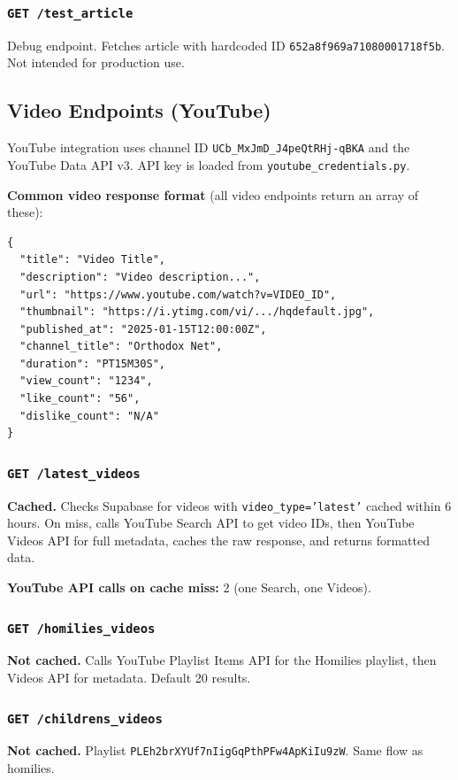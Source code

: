 \documentclass[12pt]{article}
\begin{document}
\subsubsection{\texttt{GET /test\_article}}
Debug endpoint. Fetches article with hardcoded ID \texttt{652a8f969a71080001718f5b}. Not intended for production use.

\subsection{Video Endpoints (YouTube)}

YouTube integration uses channel ID \texttt{UCb\_MxJmD\_J4peQtRHj-qBKA} and the YouTube Data API v3. API key is loaded from \texttt{youtube\_credentials.py}.

\textbf{Common video response format} (all video endpoints return an array of these):
\begin{lstlisting}[language={}, basicstyle=\ttfamily\footnotesize, frame=none, numbers=none]
{
  "title": "Video Title",
  "description": "Video description...",
  "url": "https://www.youtube.com/watch?v=VIDEO_ID",
  "thumbnail": "https://i.ytimg.com/vi/.../hqdefault.jpg",
  "published_at": "2025-01-15T12:00:00Z",
  "channel_title": "Orthodox Net",
  "duration": "PT15M30S",
  "view_count": "1234",
  "like_count": "56",
  "dislike_count": "N/A"
}
\end{lstlisting}

\subsubsection{\texttt{GET /latest\_videos}}
\textbf{Cached.} Checks Supabase for videos with \texttt{video\_type='latest'} cached within 6 hours. On miss, calls YouTube Search API to get video IDs, then YouTube Videos API for full metadata, caches the raw response, and returns formatted data.

\textbf{YouTube API calls on cache miss:} 2 (one Search, one Videos).

\subsubsection{\texttt{GET /homilies\_videos}}
\textbf{Not cached.} Calls YouTube Playlist Items API for the Homilies playlist, then Videos API for metadata. Default 20 results.

\subsubsection{\texttt{GET /childrens\_videos}}
\textbf{Not cached.} Playlist \texttt{PLEh2brXYUf7nIigGqPthPFw4ApKiIu9zW}. Same flow as homilies.
\end{document}
